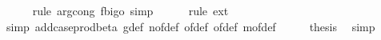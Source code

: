 \begin{isabellebody}
\ \ \ \ \isamarkupfalse%
\ {\isacharparenleft}{\kern0pt}rule\ arg{\isacharunderscore}{\kern0pt}cong{}{\isacharbrackleft}{\kern0pt}\ f{\isacharequal}{\kern0pt}{\isachardoublequoteopen}bigo{\isachardoublequoteclose}{\isacharbrackright}{\kern0pt}{\isacharcomma}{\kern0pt}\ simp{\isacharparenright}{\kern0pt}\isanewline
\ \ \ \ \isamarkupfalse%
\ {\isacharparenleft}{\kern0pt}rule\ ext{\isacharparenright}{\kern0pt}\isanewline
\ \ \ \ \isamarkupfalse%
\ {\isacharparenleft}{\kern0pt}simp\ add{\isacharcolon}{\kern0pt}case{\isacharunderscore}{\kern0pt}prod{\isacharunderscore}{\kern0pt}beta{\isacharprime}{\kern0pt}\ g{\isacharunderscore}{\kern0pt}def\ n{\isacharunderscore}{\kern0pt}of{\isacharunderscore}{\kern0pt}def\ {\isasymepsilon}{\isacharunderscore}{\kern0pt}of{\isacharunderscore}{\kern0pt}def\ {\isasymdelta}{\isacharunderscore}{\kern0pt}of{\isacharunderscore}{\kern0pt}def\ m{\isacharunderscore}{\kern0pt}of{\isacharunderscore}{\kern0pt}def{\isacharparenright}{\kern0pt}\isanewline
\ \ \isamarkupfalse%
\ \isamarkupfalse%
\ {\isacharquery}{\kern0pt}thesis\ \isamarkupfalse%
\ simp\isanewline
{}\isamarkupfalse%
%
\endisatagproof
{\isafoldproof}%
%
\isadelimproof
\isanewline
%
\endisadelimproof
%
\isadelimtheory
\isanewline
%
\endisadelimtheory
%
\isatagtheory
{}\isamarkupfalse%
%
\endisatagtheory
{\isafoldtheory}%
%
\isadelimtheory
%
\endisadelimtheory
%
\end{isabellebody}%
\endinput
